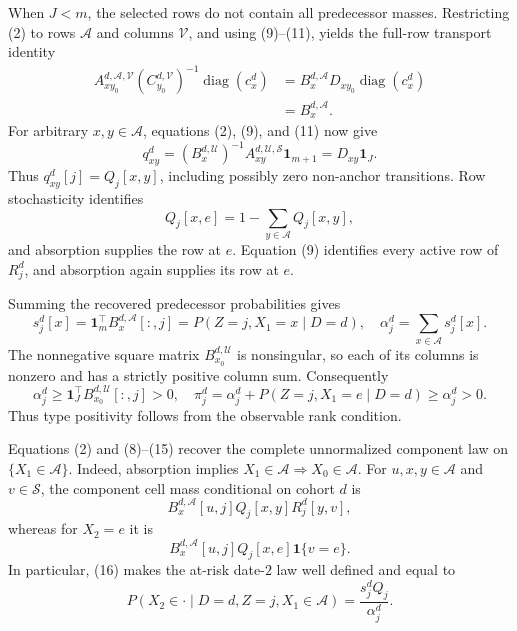 When \(J<m\), the selected rows do not contain all predecessor masses.  Restricting (2) to rows \(\mathcal A\) and columns \(\mathcal V\), and using (9)--(11), yields the full-row transport identity
\[
\begin{aligned}
 A_{xy_0}^{d,\mathcal A,\mathcal V}(C_{y_0}^{d,\mathcal V})^{-1}
 \operatorname{diag}(c_x^d)
 &=B_x^{d,\mathcal A}D_{xy_0}\operatorname{diag}(c_x^d)\\
 &=B_x^{d,\mathcal A}.
\end{aligned}
\tag{12}
\]
For arbitrary \(x,y\in\mathcal A\), equations (2), (9), and (11) now give
\[
 q_{xy}^d=(B_x^{d,\mathcal U})^{-1}
 A_{xy}^{d,\mathcal U,\mathcal S}\mathbf1_{m+1}
 =D_{xy}\mathbf1_J.
\tag{13}
\]
Thus \(q_{xy}^d[j]=Q_j[x,y]\), including possibly zero non-anchor transitions.  Row stochasticity identifies
\[
 Q_j[x,e]=1-\sum_{y\in\mathcal A}Q_j[x,y],
\tag{14}
\]
and absorption supplies the row at \(e\).  Equation (9) identifies every active row of \(R_j^d\), and absorption again supplies its row at \(e\).

Summing the recovered predecessor probabilities gives
\[
 s_j^d[x]=\mathbf1_m^\top B_x^{d,\mathcal A}[:,j]
 =P(Z=j,X_1=x\mid D=d),
 \quad
 \alpha_j^d=\sum_{x\in\mathcal A}s_j^d[x].
\tag{15}
\]
The nonnegative square matrix \(B_{x_0}^{d,\mathcal U}\) is nonsingular, so each of its columns is nonzero and has a strictly positive column sum.  Consequently
\[
 \alpha_j^d\geq\mathbf1_J^\top B_{x_0}^{d,\mathcal U}[:,j]>0,
 \quad
 \pi_j^d=\alpha_j^d+P(Z=j,X_1=e\mid D=d)\geq\alpha_j^d>0.
\tag{16}
\]
Thus type positivity follows from the observable rank condition.

Equations (2) and (8)--(15) recover the complete unnormalized component law on \(\{X_1\in\mathcal A\}\).  Indeed, absorption implies \(X_1\in\mathcal A\Rightarrow X_0\in\mathcal A\).  For \(u,x,y\in\mathcal A\) and \(v\in\mathcal S\), the component cell mass conditional on cohort \(d\) is
\[
 B_x^{d,\mathcal A}[u,j]Q_j[x,y]R_j^d[y,v],
\tag{17}
\]
whereas for \(X_2=e\) it is
\[
 B_x^{d,\mathcal A}[u,j]Q_j[x,e]\mathbf1\{v=e\}.
\]
In particular, (16) makes the at-risk date-\(2\) law well defined and equal to
\[
 P(X_2\in\cdot\mid D=d,Z=j,X_1\in\mathcal A)
 =\frac{s_j^dQ_j}{\alpha_j^d}.
\tag{18}
\]

